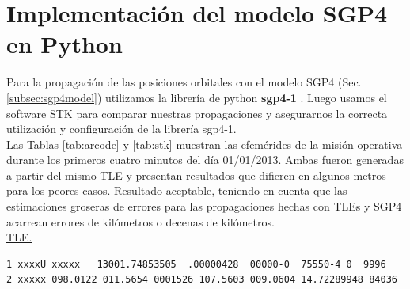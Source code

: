\section{Implementaci\'on del modelo SGP4 en Python}

Para la propagaci\'on de las posiciones orbitales con el modelo SGP4 (Sec. \ref{subsec:sgp4model}) utilizamos la librer\'ia de python {\bf{sgp4-1}} \citep{sgp4python}.
Luego usamos el software STK para comparar nuestras propagaciones y asegurarnos la correcta utilizaci\'on y configuraci\'on de la librer\'ia sgp4-1.\\

Las Tablas \ref{tab:arcode}  y \ref{tab:stk} muestran las efem\'erides de la misi\'on operativa durante los primeros cuatro minutos del d\'ia 01/01/2013.
Ambas fueron generadas a partir del mismo TLE y presentan resultados que difieren en algunos metros para los peores casos. Resultado aceptable, teniendo en cuenta que las estimaciones groseras de errores para las propagaciones hechas con TLEs y SGP4 acarrean errores de kil\'ometros o decenas de kil\'ometros.\\

\underline{TLE.}
{\small
\begin{verbatim}
1 xxxxU xxxxx   13001.74853505  .00000428  00000-0  75550-4 0  9996
2 xxxxx 098.0122 011.5654 0001526 107.5603 009.0604 14.72289948 84036
\end{verbatim}}


\begin{table}[!h]
\caption{Resultados que genera ARxCODE utilizando la librer\'ia sgp4 de python para la propagaci\'on.}
\centering
{}
\end{table}

